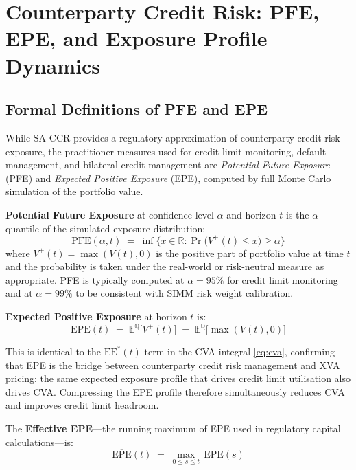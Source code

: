 \documentclass[12pt,letterpaper]{article}
\numberwithin{equation}{section}
\theoremstyle{remark}
\newcommand{\EQ}{\mathbb{E}^{\mathbb{Q}}}          %
\newcommand{\EE}{\mathrm{EE}}
\newcommand{\PFE}{\mathrm{PFE}}
\newcommand{\EPE}{\mathrm{EPE}}
\begin{document}
\section{Counterparty Credit Risk: PFE, EPE, and Exposure Profile Dynamics}
\label{sec:ccr}

\subsection{Formal Definitions of PFE and EPE}

While SA-CCR provides a regulatory approximation of counterparty credit risk
exposure, the practitioner measures used for credit limit monitoring, default
management, and bilateral credit management are \emph{Potential Future
Exposure} (PFE) and \emph{Expected Positive Exposure} (EPE), computed by
full Monte Carlo simulation of the portfolio value.

\textbf{Potential Future Exposure} at confidence level $\alpha$ and
horizon $t$ is the $\alpha$-quantile of the simulated exposure distribution:
\begin{equation}
  \PFE(\alpha, t) \;=\;
  \inf\bigl\{x \in \mathbb{R} : \Pr\bigl(V^+(t) \leq x\bigr)
  \geq \alpha\bigr\}
  \label{eq:pfe}
\end{equation}
where $V^+(t) = \max(V(t), 0)$ is the positive part of portfolio value at
time $t$ and the probability is taken under the real-world or risk-neutral
measure as appropriate. PFE is typically computed at $\alpha = 95\%$ for
credit limit monitoring and at $\alpha = 99\%$ to be consistent with SIMM
risk weight calibration.

\textbf{Expected Positive Exposure} at horizon $t$ is:
\begin{equation}
  \EPE(t) \;=\; \EQ\!\bigl[V^+(t)\bigr]
  \;=\; \EQ\!\bigl[\max(V(t), 0)\bigr]
  \label{eq:epe}
\end{equation}

This is identical to the $\EE^{*}(t)$ term in the CVA integral
\eqref{eq:cva}, confirming that EPE is the bridge between counterparty
credit risk management and XVA pricing: the same expected exposure profile
that drives credit limit utilisation also drives CVA. Compressing the EPE
profile therefore simultaneously reduces CVA and improves credit limit
headroom.

The \textbf{Effective EPE}---the running maximum of EPE used in regulatory
capital calculations---is:
\begin{equation}
  \overline{\EPE}(t) \;=\;
  \max_{0 \leq s \leq t}\,\EPE(s)
  \label{eq:effe}
\end{equation}
\end{document}
